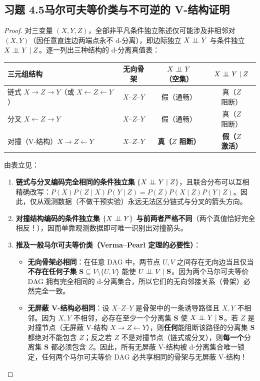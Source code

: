 \subsection*{习题 4.5\quad 马尔可夫等价类与不可逆的 V-结构证明}
\begin{proof}
对三变量 $(X, Y, Z)$，全部非平凡条件独立陈述仅可能涉及非相邻对 $(X, Y)$（因任意直连边两端点永不 d-分离），即边际独立 $X \perp\!\!\!\perp Y$ 与条件独立 $X \perp\!\!\!\perp Y \mid Z$。逐一列出三种结构的 d-分离真值表：

\begin{center}
\small
\begin{tabular}{@{}lccc@{}}
\toprule
\textbf{三元组结构} & \textbf{无向骨架} & $X \perp\!\!\!\perp Y$（空集） & $X \perp\!\!\!\perp Y \mid Z$ \\
\midrule
链式 $X \to Z \to Y$（或 $X \leftarrow Z \leftarrow Y$） & $X\text{--}Z\text{--}Y$ & 假（通畅） & 真（$Z$ 阻断） \\
分叉 $X \leftarrow Z \to Y$ & $X\text{--}Z\text{--}Y$ & 假（通畅） & 真（$Z$ 阻断） \\
对撞（V-结构）$X \to Z \leftarrow Y$ & $X\text{--}Z\text{--}Y$ & \textbf{真（$Z$ 阻断）} & \textbf{假（$Z$ 激活）} \\
\bottomrule
\end{tabular}
\end{center}
由表立见：
\begin{enumerate}[label=(\arabic*), leftmargin=1.8em]
  \item \textbf{链式与分叉编码完全相同的条件独立集} $\{X \perp\!\!\!\perp Y \mid Z\}$，且联合分布可以互相精确改写：$P(X)P(Z\mid X)P(Y\mid Z) = P(Z)P(X\mid Z)P(Y\mid Z)$。因此，仅从观测数据（不做干预实验）永远无法区分链式与分叉的箭头方向。
  \item \textbf{对撞结构编码的条件独立集 $\{X \perp\!\!\!\perp Y\}$ 与前两者严格不同}（两个真值恰好完全相反！），因而单靠观测数据即可唯一识别出对撞箭头。
  \item \textbf{推及一般马尔可夫等价类（Verma--Pearl 定理的必要性）}：
  \begin{itemize}
    \item \textbf{无向骨架必相同}：在任意 DAG 中，两节点 $U, V$ 之间存在无向边当且仅当\textbf{不存在任何子集} $\mathbf{S} \subseteq V \setminus \{U, V\}$ 能使 $U \perp\!\!\!\perp V \mid \mathbf{S}$。因为两个马尔可夫等价 DAG 拥有完全相同的 d-分离集合，所以它们的无向邻接关系（骨架）必然完全一致。
    \item \textbf{无屏蔽 V-结构必相同}：设 $X\text{--}Z\text{--}Y$ 是骨架中的一条诱导路径且 $X, Y$ 不相邻。因为 $X, Y$ 不相邻，必存在至少一个分离集 $\mathbf{S}$ 使 $X \perp\!\!\!\perp Y \mid \mathbf{S}$。若 $Z$ 是对撞节点（无屏蔽 V-结构 $X \to Z \leftarrow Y$），则\textbf{任何}能阻断该路径的分离集 $\mathbf{S}$ 都绝对不能包含 $Z$；反之若 $Z$ 不是对撞节点（链式或分叉），则\textbf{每一个}分离集 $\mathbf{S}$ 都必须包含 $Z$。因此，所有无屏蔽 V-结构被 d-分离集合唯一锁定，任何两个马尔可夫等价 DAG 必共享相同的骨架与无屏蔽 V-结构！
  \end{itemize}
\end{enumerate}
\end{proof}

